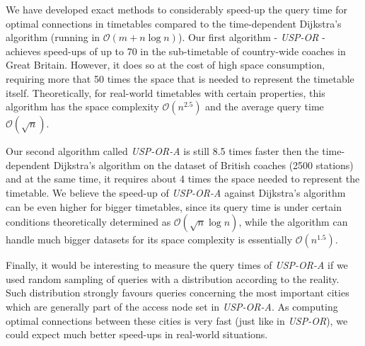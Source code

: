 We have developed exact methods to considerably speed-up the query time for optimal connections in timetables compared to the time-dependent Dijkstra's algorithm (running in $\mathcal{O}(m + n \log n)$). Our first algorithm - \textit{USP-OR} - achieves speed-ups of up to 70 in the sub-timetable of country-wide coaches in Great Britain. However, it does so at the cost of high space consumption, requiring more that 50 times the space that is needed to represent the timetable itself. Theoretically, for real-world timetables with certain properties, this algorithm has the space complexity $\mathcal{O}(n^{2.5})$ and the average query time $\mathcal{O}(\sqrt{n})$.
	
Our second algorithm called \textit{USP-OR-A} is still 8.5 times faster then the time-dependent Dijkstra's algorithm on the dataset of British coaches (2500 stations) and at the same time, it requires about 4 times the space needed to represent the timetable. We believe the speed-up of \textit{USP-OR-A} against Dijkstra's algorithm can be even higher for bigger timetables, since its query time is under certain conditions theoretically determined as $\mathcal{O}(\sqrt{n} \log n)$, while the algorithm can handle much bigger datasets for its space complexity is essentially $\mathcal{O}(n^{1.5})$. 
	
Finally, it would be interesting to measure the query times of \textit{USP-OR-A} if we used random sampling of queries with a distribution according to the reality. Such distribution strongly favours queries concerning the most important cities which are generally part of the access node set in \textit{USP-OR-A}. As computing optimal connections between these cities is very fast (just like in \textit{USP-OR}), we could expect much better speed-ups in real-world situations.